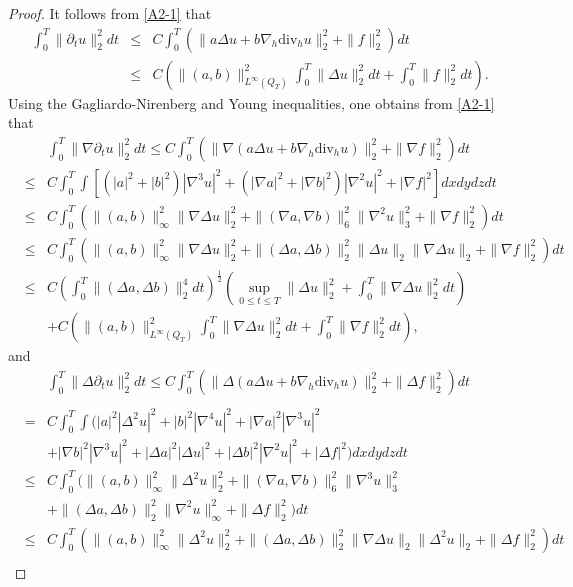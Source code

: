 \documentclass[12pt,reqno]{amsart}
\numberwithin{equation}{section}
\begin{document}
\begin{proof}
  It follows from \eqref{A2-1} that
  \begin{eqnarray}
    \int_0^T\|\partial_tu\|_2^2dt&\leq&C\int_0^T(\|a\Delta u+b\nabla_h\text{div}_hu\|_2^2+\|f\|_2^2)dt\nonumber\\
    &\leq& C\left(\|(a,b)\|_{L^\infty(Q_T)}^2\int_0^T\|\Delta u\|_2^2dt+\int_0^T\|f\|_2^2dt\right). \label{ESTDTU}
  \end{eqnarray}
Using the Gagliardo-Nirenberg and Young inequalities, one obtains from \eqref{A2-1} that
  \begin{eqnarray}
    &&\int_0^T\|\nabla\partial_tu\|_2^2dt\leq C\int_0^T(\|\nabla(a\Delta u+b\nabla_h\text{div}_hu)\|_2^2+\|\nabla f\|_2^2)dt\nonumber\\
    &\leq&C \int_0^T\int[(|a|^2+|b|^2)|\nabla^3u|^2+(|\nabla a|^2+|\nabla b|^2)|\nabla^2u|^2+|\nabla f|^2]dxdydzdt\nonumber\\
    &\leq&C\int_0^T(\|(a,b)\|_\infty^2\|\nabla\Delta u\|_2^2+\|(\nabla a, \nabla b)\|_6^2\|\nabla^2u\|_3^2+\|\nabla f\|_2^2)dt\nonumber\\
    &\leq&C\int_0^T(\|(a,b)\|_\infty^2\|\nabla\Delta u\|_2^2+\|(\Delta a, \Delta b)\|_2^2\|\Delta u\|_2\|\nabla\Delta u\|_2
    +\|\nabla f\|_2^2)dt\nonumber\\
    &\leq&
    C\left(\int_0^T\|(\Delta a,\Delta b)\|_2^4dt\right)^\frac12\left(\sup_{0\leq t\leq T}\|\Delta u\|_2^2+
    \int_0^T\|\nabla\Delta u\|_2^2dt\right)\nonumber\\
    &&+C\left(\|(a,b)\|_{L^\infty(Q_T)}^2\int_0^T\|\nabla\Delta u\|_2^2dt+ \int_0^T\|\nabla f\|_2^2dt\right),\label{ESTDTU1}
    \end{eqnarray}
and
    \begin{eqnarray}
    &&\int_0^T\|\Delta\partial_tu\|_2^2dt\leq C\int_0^T(\|\Delta(a\Delta u+b\nabla_h\text{div}_hu)\|_2^2+\|\Delta f\|_2^2)dt\nonumber\\\nonumber\\
    &=&C\int_0^T\int(|a|^2|\Delta^2u|^2+|b|^2|\nabla^4u|^2+|\nabla a|^2|\nabla^3u|^2\nonumber\\
    &&+|\nabla b|^2|\nabla^3u|^2+|\Delta a|^2|\Delta u|^2+|\Delta b|^2|\nabla^2u|^2+|\Delta f|^2)dxdydzdt\nonumber\\
    &\leq&C\int_0^T(\|(a,b)\|_\infty^2\|\Delta^2u\|_2^2+\|(\nabla a,\nabla b)\|_6^2\|\nabla^3u\|_3^2\nonumber\\
    &&+\|(\Delta a,\Delta b)\|_2^2\|\nabla^2u\|_\infty^2+\|\Delta f\|_2^2)dt\nonumber\\
    &\leq&C\int_0^T(\|(a,b)\|_\infty^2\|\Delta^2u\|_2^2+\|(\Delta a,\Delta b)\|_2^2\|\nabla\Delta u\|_2\|\Delta^2u\|_2+\|\Delta f\|_2^2)dt\nonumber\\

\end{eqnarray}
\end{proof}
\end{document}
